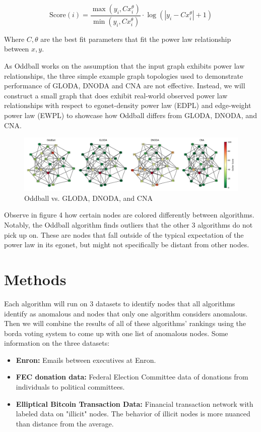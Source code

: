 \documentclass[10pt,letterpaper]{article}
\begin{document}
$$ \text{Score}(i) = \frac{\max(y_i, Cx_i^\theta)}{\min(y_i, Cx_i^\theta)} \cdot \log(|y_i - Cx_i^\theta| + 1) $$

Where $C, \theta$ are the best fit parameters that fit the power law relationship
between $x, y$.

As Oddball works on the assumption that the input graph exhibits power law relationships,
the three simple example graph topologies used to demonstrate performance
of GLODA, DNODA and CNA are not effective. Instead, we will construct a small graph that
does exhibit real-world observed power law relationships with respect to
egonet-density power law (EDPL) and edge-weight power law (EWPL) to showcase how
Oddball differs from GLODA, DNODA, and CNA\cite{RTM}.

\begin{figure}[ht]
\includegraphics[width=\textwidth]{"../graphics/OddballExample.png"}
\caption{Oddball vs. GLODA, DNODA, and CNA}
\end{figure}

Observe in figure 4 how certain nodes are colored differently between
algorithms. Notably, the Oddball algorithm finds outliers that the other 3 algorithms do not pick up on. These are nodes that fall outside of the typical expectation of the power law in its egonet, but might not specifically be distant from other nodes.

\section{Methods}

Each algorithm will run on 3 datasets to identify nodes that all algorithms identify as 
anomalous and nodes that only one algorithm considers anomalous. Then we will combine
the results of all of these algorithms' rankings using the borda voting system
to come up with one list of anomalous nodes. Some information on the three datasets:

\begin{itemize}
\item \textbf{Enron:} Emails between executives at Enron.
\item \textbf{FEC donation data:} Federal Election Committee data of donations from individuals to political committees.
\item \textbf{Elliptical Bitcoin Transaction Data:} Financial transaction network
with labeled data on "illicit" nodes. The behavior of illicit nodes is more
nuanced than distance from the average.
\end{itemize}
\end{document}
